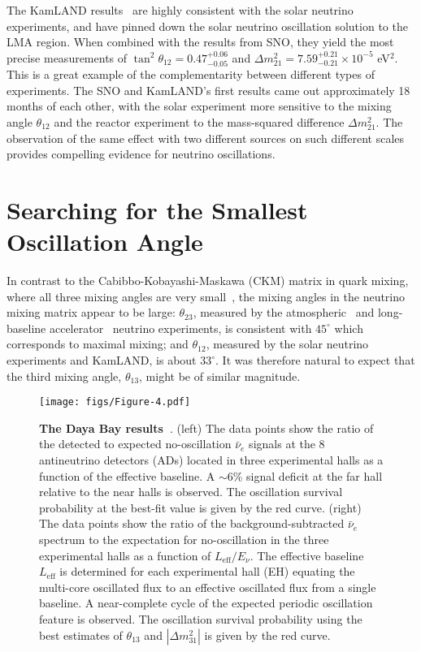 \documentclass[aps,twocolumn,preprintnumbers,amsmath,superscriptaddress,amssymb,floats,nofootinbib]{revtex4-1}
\begin{document}
The KamLAND results~\cite{Kamland03,Kamland05,Kamland08} are highly consistent with the solar neutrino experiments, and have pinned down the solar neutrino oscillation solution to the LMA region. When combined with the results from SNO, they yield the most precise measurements of $\tan^2\theta_{12} = 0.47^{+0.06}_{-0.05}$ and $\Delta m^2_{21} = 7.59^{+0.21}_{-0.21} \times 10^{-5}$ eV$^2$. 
This is a great example of the complementarity between different types of experiments. The SNO and KamLAND's first results came out approximately 18 months of each other, with the solar experiment more sensitive to the mixing angle $\theta_{12}$ and the reactor experiment to the mass-squared difference $\Delta m^2_{21}$. The observation of the same effect with two different sources on such different scales provides compelling evidence for neutrino oscillations.


\section{Searching for the Smallest Oscillation Angle} 
\label{sec:theta13}
In contrast to the  Cabibbo-Kobayashi-Maskawa (CKM) matrix in quark mixing, where all three mixing angles are very small~\cite{PDG14}, the mixing angles in the neutrino mixing matrix appear to be large: $\theta_{23}$, measured by the atmospheric~\cite{Kajita} and long-baseline accelerator~\cite{Feldman} neutrino experiments, is consistent with $45^\circ$ which corresponds to maximal mixing; and $\theta_{12}$, measured by the solar neutrino experiments and KamLAND, is about $33^\circ$. It was therefore natural to expect that the third mixing angle, $\theta_{13}$, might be of similar magnitude.

\begin{figure*}[tb]
  \centering
  \texttt{[image: figs/Figure-4.pdf]}
  \caption{ \label{fig:dayabay}{\bf The Daya Bay results~\cite{Zhang-Neutrino14}}. (left) The data points show the ratio of the detected to expected no-oscillation $\bar\nu_{e}$ signals at the 8 antineutrino detectors (ADs) located in three experimental halls as a function of the effective baseline. 
  A $\sim$6\% signal deficit at the far hall relative to the near halls is observed. 
  The oscillation survival probability at the best-fit value is given by the red curve.
  (right) The data points show the ratio of the background-subtracted $\bar\nu_e$ spectrum to the expectation for no-oscillation in the three experimental halls as a function of $L_{\textrm{eff}}/E_{\nu}$. The effective baseline $L_{\textrm{eff}}$ is determined for each experimental hall (EH) equating the multi-core oscillated flux to an effective oscillated flux from a single baseline. A near-complete cycle of the expected periodic oscillation feature is observed. The oscillation survival probability using the best estimates of $\theta_{13}$ and $|\Delta{m}^2_{31}|$ is given by the red curve.}
\end{figure*}
\end{document}
